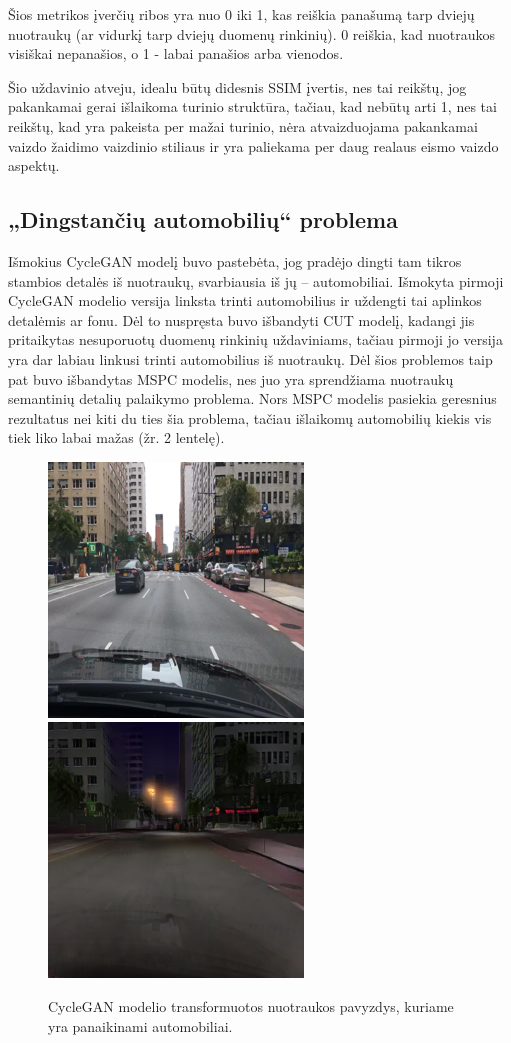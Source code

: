 \documentclass{VUMIFPSbakalaurinis}
\begin{document}
            Šios metrikos įverčių ribos yra nuo 0 iki 1, kas reiškia panašumą tarp dviejų nuotraukų (ar vidurkį tarp dviejų duomenų rinkinių). 0 reiškia, kad nuotraukos visiškai nepanašios, o 1 - labai panašios arba vienodos.

            Šio uždavinio atveju, idealu būtų didesnis SSIM įvertis, nes tai reikštų, jog pakankamai gerai išlaikoma turinio struktūra, tačiau, kad nebūtų arti 1, nes tai reikštų, kad yra pakeista per mažai turinio, nėra atvaizduojama pakankamai vaizdo žaidimo vaizdinio stiliaus ir yra paliekama per daug realaus eismo vaizdo aspektų. 
        
    \subsection{„Dingstančių automobilių“ problema}
        Išmokius CycleGAN modelį buvo pastebėta, jog pradėjo dingti tam tikros stambios detalės iš nuotraukų, svarbiausia iš jų – automobiliai. Išmokyta pirmoji CycleGAN modelio versija linksta trinti automobilius ir uždengti tai aplinkos detalėmis ar fonu. Dėl to nuspręsta buvo išbandyti CUT modelį, kadangi jis pritaikytas nesuporuotų duomenų rinkinių uždaviniams, tačiau pirmoji jo versija yra dar labiau linkusi trinti automobilius iš nuotraukų. Dėl šios problemos taip pat buvo išbandytas MSPC modelis, nes juo yra sprendžiama nuotraukų semantinių detalių palaikymo problema. Nors MSPC modelis pasiekia geresnius rezultatus nei kiti du ties šia problema, tačiau išlaikomų automobilių kiekis vis tiek liko labai mažas (žr. 2 lentelę).
        \begin{figure}[H]
            \centering
            \includegraphics[scale=0.8]{img/CycleGANV1/1_real_B}
            \includegraphics[scale=0.8]{img/CycleGANV1/1_fake_A}
            \captionsetup{width=.8\linewidth}
            \caption{CycleGAN modelio transformuotos nuotraukos pavyzdys, kuriame yra panaikinami automobiliai.}
            \label{img:mlp}
        \end{figure}
\end{document}
